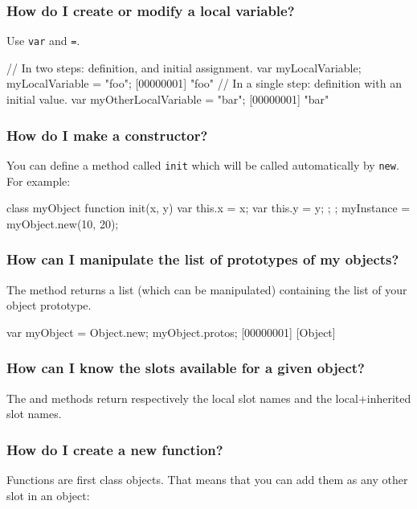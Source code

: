\subsubsection{How do I create or modify a local variable?}
Use \lstinline|var| and \lstinline|=|.

\begin{urbiscript}
// In two steps: definition, and initial assignment.
var myLocalVariable;
myLocalVariable = "foo";
[00000001] "foo"
// In a single step: definition with an initial value.
var myOtherLocalVariable = "bar";
[00000001] "bar"
\end{urbiscript}


\subsubsection{How do I make a constructor?}
You can define a method called \lstinline{init} which will be called
automatically by \lstinline{new}. For example:

\begin{urbiunchecked}
class myObject
{
  function init(x, y)
  {
    var this.x = x;
    var this.y = y;
  };
};
myInstance = myObject.new(10, 20);
\end{urbiunchecked}


\subsubsection{How can I manipulate the list of prototypes of my objects?}
The  method returns a list (which can be manipulated)
containing the list of your object prototype.

\begin{urbiunchecked}
var myObject = Object.new;
myObject.protos;
[00000001] [Object]
\end{urbiunchecked}

\subsubsection{How can I know the slots available for a given object?}
The  and  methods
return respectively the local slot names and the local+inherited slot
names.

\subsubsection{How do I create a new function?}
Functions are first class objects. That means that you can add them as
any other slot in an object:

